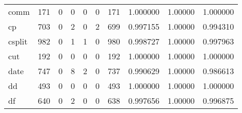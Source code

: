 \begin{tabular}{lrrrrrrrrr}
comm      &                    171 &                                  0 &                                 0 &                                0 &                                 0 &                             171 &                                1.000000 &                                1.00000 &                             1.000000 \\
cp        &                    703 &                                  0 &                                 2 &                                0 &                                 2 &                             699 &                                0.997155 &                                1.00000 &                             0.994310 \\
csplit    &                    982 &                                  0 &                                 1 &                                1 &                                 0 &                             980 &                                0.998727 &                                1.00000 &                             0.997963 \\
cut       &                    192 &                                  0 &                                 0 &                                0 &                                 0 &                             192 &                                1.000000 &                                1.00000 &                             1.000000 \\
date      &                    747 &                                  0 &                                 8 &                                2 &                                 0 &                             737 &                                0.990629 &                                1.00000 &                             0.986613 \\
dd        &                    493 &                                  0 &                                 0 &                                0 &                                 0 &                             493 &                                1.000000 &                                1.00000 &                             1.000000 \\
df        &                    640 &                                  0 &                                 2 &                                0 &                                 0 &                             638 &                                0.997656 &                                1.00000 &                             0.996875 \\

\end{tabular}
